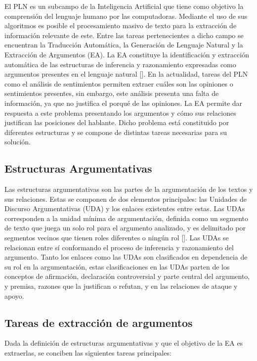 \documentclass[a4paper,11pt,twocolumn,twoside]{article}
\begin{document}
El PLN es un subcampo de la Inteligencia Artificial que tiene como objetivo la comprensión 
del lenguaje humano por las computadoras. 
Mediante el uso de sus algoritmos es posible el procesamiento masivo de texto para la extracción de información 
relevante de este. Entre las tareas pertenecientes a dicho campo se encuentran la Traducción Automática, 
la Generación de Lenguaje Natural y la Extracción de Argumentos (EA). La EA constituye la identificación y extracción 
automática de las estructuras de inferencia y 
razonamiento expresadas como argumentos presentes en el lenguaje natural [\cite{lawrence2020argument}].
En la actualidad, tareas del PLN como el análisis de sentimientos permiten 
extraer cuáles son las opiniones o sentimientos presentes, sin embargo, este análisis presenta una falta 
de información, ya que no justifica el porqué de las opiniones. La EA permite dar respuesta a este problema presentando
los argumentos y cómo sus relaciones justifican las posiciones del hablante. Dicho problema está constituido por diferentes 
estructuras y se compone de distintas tareas necesarias para su solución.

\subsection{Estructuras Argumentativas}

Las estructuras argumentativas son las partes de la argumentación de los textos y sus relaciones.
Estas se componen de dos elementos principales: las Unidades de Discurso Argumentativas (UDA) y los enlaces
existentes entre estas. Las UDAs corresponden a la unidad mínima de argumentación, definida 
como un segmento de texto que juega un solo rol para el argumento analizado, y es 
delimitado por segmentos vecinos que tienen roles diferentes o ningún rol [\cite{stede2018argumentation}].
Las UDAs se relacionan entre sí conformando el proceso de inferencia y razonamiento del argumento.
Tanto los enlaces como las UDAs son clasificados en dependencia de su rol en la argumentación, estas clasificaciones 
en las UDAs parten de los conceptos de afirmación, declaración controversial y parte central del argumento, y premisa,
razones que la justifican o refutan, y en las relaciones de ataque y apoyo. 

\subsection{Tareas de extracción de argumentos}

Dada la definición de estructuras argumentativas y que el objetivo de la EA es extraerlas,
se conciben las siguientes tareas principales:
\end{document}
